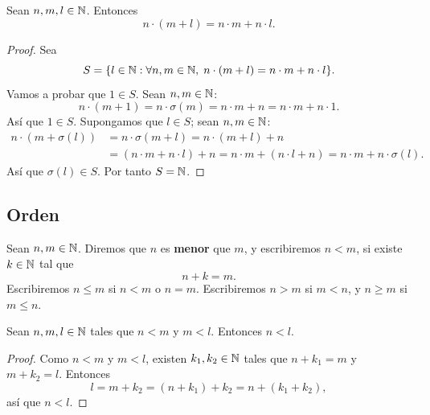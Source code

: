 \documentclass[12pt,a4paper]{book}
\begin{document}
    \begin{proposicion}
        Sean $n,m,l \in \mathbb{N}$. Entonces
        \begin{equation*}
            n \cdot (m+l) = n \cdot m + n \cdot l.
        \end{equation*}
    \end{proposicion}
    \begin{proof}
        Sea
        \begin{equation*}
            S = \{l \in \mathbb{N} : \forall n,m \in \mathbb{N}, \; n\cdot(m+l) = n\cdot m+n\cdot l\}.
        \end{equation*}
        Vamos a probar que $1 \in S$. Sean $n,m \in \mathbb{N}$:
        \begin{equation*}
            n\cdot(m+1) = n \cdot \sigma(m) = n\cdot m+n = n \cdot m+n\cdot 1.
        \end{equation*}
        Así que $1 \in S$. Supongamos que $l \in S$; sean $n,m \in \mathbb{N}$:
        \begin{align*}
            n\cdot(m+\sigma(l)) &= n\cdot \sigma(m+l) = n\cdot(m+l)+n \\
            &= (n\cdot m+n\cdot l)+n = n\cdot m+(n\cdot l+n) = n\cdot m+n\cdot \sigma(l).
        \end{align*}
        Así que $\sigma(l) \in S$. Por tanto $S=\mathbb{N}$.
    \end{proof}

    \subsection{Orden}

    \begin{definicion}
        Sean $n,m \in \mathbb{N}$. Diremos que $n$ es \textbf{menor} que $m$, y escribiremos $n < m$, si existe $k \in \mathbb{N}$ tal que
        \begin{equation*}
            n+k=m.
        \end{equation*}
        Escribiremos $n \le m$ si $n<m$ o $n=m$. Escribiremos $n>m$ si $m<n$, y $n\ge m$ si $m\le n$.
    \end{definicion}

    \begin{lema}
        \label{lem:orden-transitivo}
        Sean $n,m,l\in\mathbb{N}$ tales que $n<m$ y $m<l$. Entonces $n<l$.
    \end{lema}
    \begin{proof}
        Como $n<m$ y $m<l$, existen $k_1,k_2\in\mathbb{N}$ tales que $n+k_1=m$ y $m+k_2=l$. Entonces
        \begin{equation*}
            l = m+k_2 = (n+k_1)+k_2 = n+(k_1+k_2),
        \end{equation*}
        así que $n<l$.
    \end{proof}
\end{document}
